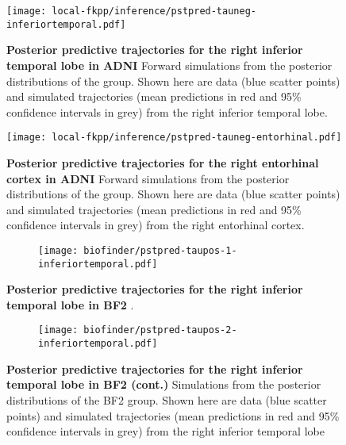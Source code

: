 \begin{figure}[H]
    \centering
    \texttt{[image: local-fkpp/inference/pstpred-tauneg-inferiortemporal.pdf]}
    \caption{\textbf{Posterior predictive trajectories for the right inferior
    temporal lobe in ADNI \ABP \TPN}Forward simulations from the posterior
    distributions of the \TPN group. Shown here are data (blue scatter points)
    and simulated trajectories (mean predictions in red and 95\% confidence
    intervals in grey) from the right inferior temporal lobe.}
    \label{fig:pstpred-tauneg-it}
\end{figure}

\begin{figure}[H]
    \centering
    \texttt{[image: local-fkpp/inference/pstpred-tauneg-entorhinal.pdf]}
    \caption{\textbf{Posterior predictive trajectories for the right entorhinal
    cortex in ADNI \ABP \TPN}Forward simulations from the posterior
    distributions of the \TPN group. Shown here are data (blue scatter points)
    and simulated trajectories (mean predictions in red and 95\% confidence
    intervals in grey) from the right entorhinal cortex.}
    \label{fig:pstpred-tauneg-ec}
\end{figure}


\begin{figure}[H]
    \centering
    \begin{subfigure}{1.0\textwidth}
        \texttt{[image: biofinder/pstpred-taupos-1-inferiortemporal.pdf]}
        \label{fig:pstpred-taupos-it-1-bf}
    \end{subfigure} 
    \medskip
    \caption{\textbf{Posterior predictive trajectories for the right 
                     inferior temporal lobe in BF2 \ABP \TPP}.}
\end{figure}%
\begin{figure}[H]\ContinuedFloat
    \centering
    \begin{subfigure}{1.0\textwidth}
        \texttt{[image: biofinder/pstpred-taupos-2-inferiortemporal.pdf]}
        \label{fig:pstpred-taupos-it-2-bf}
    \end{subfigure}
    \caption[]{\textbf{Posterior predictive trajectories for the right
                       inferior temporal lobe in BF2 \ABP \TPP (cont.)}
    Simulations from the posterior distributions of the BF2
    \ABP \TPP group. Shown here are data (blue scatter points) and simulated 
    trajectories (mean predictions in red and 95\% confidence intervals in grey)
    from the right inferior temporal lobe}
    \label{fig:pstpred-taupos-it-bf}
\end{figure}

